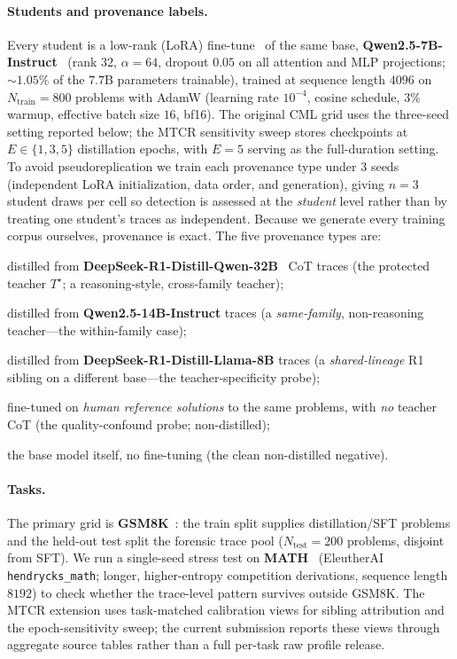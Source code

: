 \documentclass[journal]{IEEEtran}
\begin{document}
\paragraph{Students and provenance labels.}
Every student is a low-rank (LoRA) fine-tune~\citep{hu2022lora} of the same base,
\textbf{Qwen2.5-7B-Instruct}~\citep{qwen2025qwen25}
(rank $32$, $\alpha\!=\!64$, dropout $0.05$ on all attention and MLP projections; $\sim\!1.05\%$ of
the $7.7$B parameters trainable), trained at sequence length $4096$ on
$N_{\mathrm{train}}=800$ problems with AdamW (learning rate $10^{-4}$, cosine schedule, $3\%$ warmup,
effective batch size $16$, bf16). The original CML grid uses the three-seed setting
reported below; the MTCR sensitivity sweep stores checkpoints at $E\in\{1,3,5\}$
distillation epochs, with $E=5$ serving as the full-duration setting. To avoid pseudoreplication we train each provenance type under
$3$ seeds (independent LoRA initialization, data order, and generation), giving $n\!=\!3$ student
draws per cell so detection is assessed at the \emph{student} level rather than by treating one
student's traces as independent. Because we generate every training corpus ourselves, provenance is
exact. The five provenance types are:
\begin{description}[leftmargin=1.4em,itemsep=1pt]
  \item[\texttt{suspect}] distilled from \textbf{DeepSeek-R1-Distill-Qwen-32B}~\citep{deepseekai2025r1} CoT traces (the
        protected teacher $T^\star$; a reasoning-style, cross-family teacher);
  \item[\texttt{ctrlInst}] distilled from \textbf{Qwen2.5-14B-Instruct} traces (a
        \emph{same-family}, non-reasoning teacher---the within-family case);
  \item[\texttt{ctrlLlama}] distilled from \textbf{DeepSeek-R1-Distill-Llama-8B} traces (a
        \emph{shared-lineage} R1 sibling on a different base---the teacher-specificity probe);
  \item[\texttt{ctrlC}] fine-tuned on \emph{human reference solutions} to the same problems, with
        \emph{no} teacher CoT (the quality-confound probe; non-distilled);
  \item[\texttt{ctrlA}] the base model itself, no fine-tuning (the clean non-distilled negative).
\end{description}

\paragraph{Tasks.}
The primary grid is \textbf{GSM8K}~\citep{cobbe2021gsm8k}: the train split supplies distillation/SFT problems and the
held-out test split the forensic trace pool ($N_{\mathrm{test}}=200$ problems, disjoint from SFT).
We run a single-seed stress test on \textbf{MATH}~\citep{hendrycks2021math}
(EleutherAI \texttt{hendrycks\_math}; longer, higher-entropy competition derivations,
sequence length $8192$) to check whether the trace-level pattern survives outside
GSM8K. The MTCR extension uses task-matched calibration views for sibling
attribution and the epoch-sensitivity sweep; the current submission reports these
views through aggregate source tables rather than a full per-task raw profile release.
\end{document}
